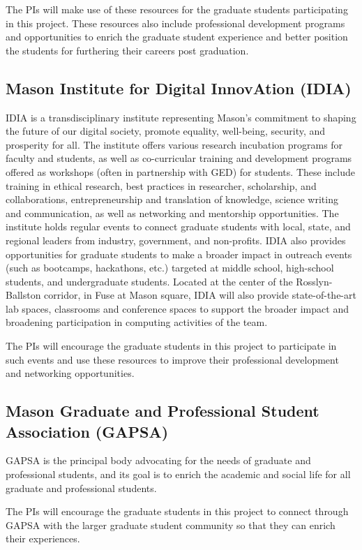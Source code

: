 \documentclass[11pt]{article}
\begin{document}
The PIs will make use of these resources for the graduate students participating in this project. These resources also include professional development programs and opportunities to enrich the graduate student experience and better position the students for furthering their careers post graduation.

\subsection*{Mason Institute for Digital InnovAtion (IDIA)} IDIA is a transdisciplinary institute representing Mason’s commitment to shaping the future of our digital society, promote equality, well-being, security, and prosperity for all. The institute offers various research incubation programs for faculty and students, as well as co-curricular training and development programs offered as workshops (often in partnership with GED) for students. These include training in ethical research, best practices in researcher, scholarship, and collaborations, entrepreneurship and translation of knowledge, science writing and communication, as well as networking and mentorship opportunities. The institute holds regular events to connect graduate students with local, state, and regional leaders from industry, government, and non-profits. IDIA also provides opportunities for graduate students to make a broader impact in outreach events (such as bootcamps, hackathons, etc.) targeted at middle school, high-school students, and undergraduate students. Located at the center of the Rosslyn-Ballston corridor, in Fuse at Mason square, IDIA will also provide state-of-the-art lab spaces, classrooms and conference spaces to support the broader impact and broadening participation in computing activities of the team.

The PIs will encourage the graduate students in this project to participate in such events and use these resources to improve their professional development and networking opportunities.

\subsection*{Mason Graduate and Professional Student Association (GAPSA)}  GAPSA is the principal body advocating for the needs of graduate and professional students, and its goal is to enrich the academic and social life for all graduate and professional students.

The PIs will encourage the graduate students in this project to connect through GAPSA with the larger graduate student community so that they can enrich their experiences.
\end{document}
